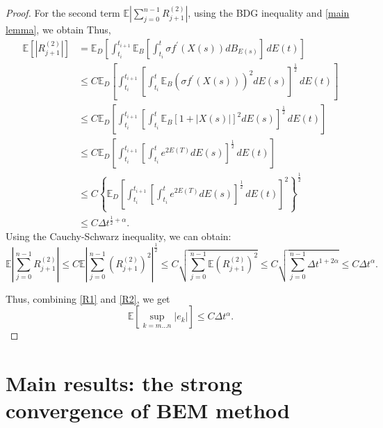 \documentclass[10pt,reqno,final]{amsart}
\theoremstyle{plain}
\theoremstyle{definition}
\theoremstyle{remark}
\numberwithin{equation}{section}
\numberwithin{figure}{section}
\numberwithin{table}{section}
\begin{document}
\begin{proof}
	For the second term \( \mathbb{E}\left|\sum\limits_{j=0}^{n-1}R_{j+1}^{(2)}\right| \), using the BDG inequality and \cref{main lemma}, we obtain
	Thus,
	\begin{align*}
		\mathbb{E} \left[|R_{j+1}^{(2)}| \right] &= \mathbb{E}_D \left[
		\int_{t_i}^{t_{i+1}} \mathbb{E}_B  \left[\int_{t_i}^{t}  \sigma f^{\prime}(X(s)) dB_{E(s)}\right] \, dE(t)
		\right] \\
		& \le C\mathbb{E}_D \left[
		\int_{t_i}^{t_{i+1}} \left[\int_{t_i}^{t}  \mathbb{E}_B\left(\sigma f^{\prime}(X(s))\right)^2 dE(s)\right]^{\frac{1}{2}} \, dE(t)
		\right] \\
		& \le C\mathbb{E}_D \left[
		\int_{t_i}^{t_{i+1}} \left[\int_{t_i}^{t}   \mathbb{E}_B \left[1+|X(s)|\right]^2 dE(s)\right]^{\frac{1}{2}} \, dE(t)
		\right] \\
		&\le C \mathbb{E}_D \left[
		\int_{t_i}^{t_{i+1}} \left[\int_{t_i}^{t}  e^{2E(T)} dE(s)\right]^{\frac{1}{2}} \, dE(t)\right]\\
		&\le C \left\{\mathbb{E}_D \left[
		\int_{t_i}^{t_{i+1}} \left[\int_{t_i}^{t}  e^{2E(T)} dE(s)\right]^{\frac{1}{2}} \, dE(t)\right]^2\right\}^{\frac{1}{2}}\\
		&\le C\Delta t^{\frac{1}{2}+\alpha}.
	\end{align*}
	Using the Cauchy-Schwarz inequality, we can obtain:
	\begin{equation}\label{R2}
		\mathbb{E}\left|\sum_{j=0}^{n-1}R_{j+1}^{(2)}\right|  \le C\mathbb{E} \left|\sum_{j=0}^{n-1}(R_{j+1}^{(2)})^2\right|^{\frac{1}{2}} \le C\sqrt{\sum_{j=0}^{n-1}\mathbb{E}(R_{j+1}^{(2)})^2}
		\le C\sqrt{\sum_{j=0}^{n-1}\Delta t^{1+2\alpha}} \le C\Delta t^{\alpha}.
	\end{equation}
	
	Thus, combining \cref{R1} and \cref{R2}, we get
	$$\mathbb{E}\left[\sup\limits_{k=m \ldots n}\left|e_k\right|\right] \leq C\Delta t^\alpha.$$
	
\end{proof}


\section{Main results: the strong convergence of BEM method}
\end{document}
